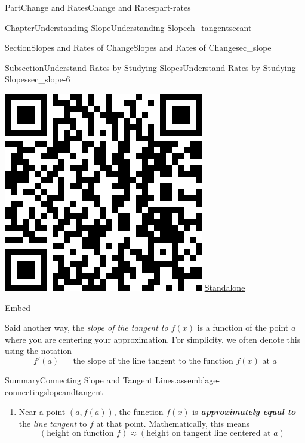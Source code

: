 \documentclass[oneside,10pt,]{tufte-book}
\newcommand{\alert}[1]{\textbf{\textit{#1}}}
\numberwithin{equation}{chapter}
\begin{document}
\begin{partptx}{Part}{Change and Rates}{}{Change and Rates}{}{}{part-rates}
\begin{chapterptx}{Chapter}{Understanding Slope}{}{Understanding Slope}{}{}{ch_tangentsecant}
\begin{sectionptx}{Section}{Slopes and Rates of Change}{}{Slopes and Rates of Change}{}{}{sec_slope}
\begin{subsectionptx}{Subsection}{Understand Rates by Studying Slopes}{}{Understand Rates by Studying Slopes}{}{}{sec_slope-6}
\begin{sidebyside}{2}{0.075}{0.075}{0.17}
\begin{sbspanel}{0.21}
\includegraphics[width=\linewidth]{generated/qrcode/sec_slope-6-9.png}
\href{http://webwork.bridgew.edu/oer/functions_at_work/sec_slope-6-9.html}{Standalone}%
\par
\href{http://webwork.bridgew.edu/oer/functions_at_work/sec_slope-6-9-if.html}{Embed}%
\end{sbspanel}%
\end{sidebyside}%
\par
Said another way, the \emph{slope of the tangent to \(f(x)\)} is a function of the point \(a\) where you are centering your approximation. For simplicity, we often denote this using the notation%
\begin{equation*}
f'(a) = \text{ the slope of the line tangent to the function }f(x)\text{ at }a
\end{equation*}
%
\begin{assemblage}{Summary}{Connecting Slope and Tangent Lines.}{assemblage-connectingslopeandtangent}%
%
\begin{enumerate}
\item{}Near a point \((a,f(a))\), the function \(f(x)\) is \alert{approximately equal to} the \emph{line tangent} to \(f\) at that point. Mathematically, this means%
\begin{equation*}
(\text{height on function }f) \approx (\text{height on tangent line centered at } a)

\end{equation*}
\end{enumerate}
\end{assemblage}
\end{subsectionptx}
\end{sectionptx}
\end{chapterptx}
\end{partptx}
\end{document}
